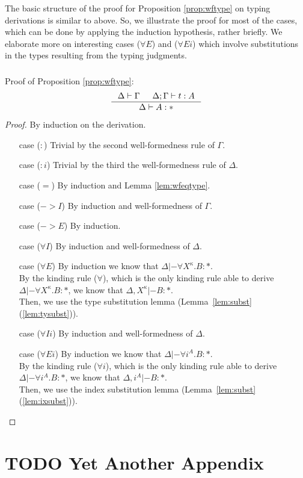 The basic structure of the proof for Proposition \ref{prop:wftype}
on typing derivations is similar to above. So, we illustrate the proof
for most of the cases, which can be done by applying the induction hypothesis,
rather briefly. We elaborate more on interesting cases ($\forall E$) and
($\forall Ei$) which involve substitutions in the types resulting from
the typing judgments.

\paragraph{}
Proof of Proposition \ref{prop:wftype}:
\[ \inference{ \Delta |- \Gamma & \Delta;\Gamma |- t : A}{ \Delta |- A : * }
\]
\begin{proof} By induction on the derivation.
\begin{itemize}
\item[case] ($:$)
	Trivial by the second well-formedness rule of $\Gamma$.
\item[case] ($:i$)
	Trivial by the third the well-formedness rule of $\Delta$.
\item[case] ($=$)
	By induction and Lemma \ref{lem:wfeqtype}.
\item[case] ($->$$I$)
	By induction and well-formedness of $\Gamma$.
\item[case] ($->$$E$)
	By induction.
\item[case] ($\forall I$)
	By induction and well-formedness of $\Delta$.
\item[case] ($\forall E$)
	By induction we know that $\Delta |- \forall X^\kappa.B : *$.\\
	By the kinding rule ($\forall$), which is the only kinding rule
	able to derive $\Delta |- \forall X^\kappa.B : *$, we know
	that $\Delta,X^\kappa |- B : *$.\\
	Then, we use the type substitution lemma
	(Lemma~\ref{lem:subst}(\ref{lem:tysubst})).
\item[case] ($\forall Ii$)
	By induction and well-formedness of $\Delta$.
\item[case] ($\forall Ei$)
	By induction we know that $\Delta |- \forall i^A.B : *$.\\
	By the kinding rule ($\forall i$), which is the only kinding rule
	able to derive $\Delta |- \forall i^A.B : *$, we know
	that $\Delta,i^A |- B : *$.\\
	Then, we use the index substitution lemma
	(Lemma~\ref{lem:subst}(\ref{lem:ixsubst})).\qedhere
\end{itemize}
\end{proof}



\chapter{TODO Yet Another Appendix}


